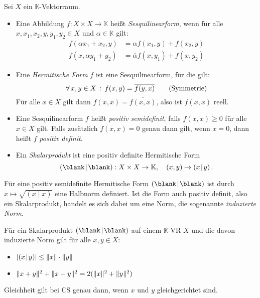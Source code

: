 \documentclass{cheat-sheet}
\newcommand{\K}{\mathbb{K}}
\newcommand{\scp}[2]{\left( #1 \!\mid\! #2 \right)} %
\begin{document}
\begin{defn}
  Sei $X$ ein $\K$-Vektorraum.
  \begin{itemize}
    \item Eine Abbildung $f : X \times X \to \K$ heißt \emph{Sesquilinearform}, wenn für alle $x, x_1, x_2, y, y_1, y_2 \in X$ und $\alpha \in \K$ gilt:
    \begin{align*}
      f(\alpha x_1 + x_2, y) &= \alpha f(x_1, y) + f(x_2, y) \tag*{(Linearität im 1. Arg)} \\
      f(x, \alpha y_1 + y_2) &= \overline{\alpha} f(x, y_1) + f(x, y_2) \tag*{(Antilinearität im 2. Arg)}
    \end{align*}
    \item Eine \emph{Hermitische Form} $f$ ist eine Sesquilinearform, für die gilt:
    \[ \forall \, {x, y \in X} \,:\, f(x, y) = \overline{f(y, x)} \tag*{(Symmetrie)} \]
    Für alle $x \in X$ gilt dann $f(x, x) = \overline{f(x, x)}$, also ist $f(x, x)$ reell.
    \item Eine Sesquilinearform $f$ heißt \emph{positiv semidefinit}, falls $f(x, x) \geq 0$ für alle $x \in X$ gilt. Falls zusätzlich $f(x, x) = 0$ genau dann gilt, wenn $x = 0$, dann heißt $f$ \emph{positiv definit}.
    \item Ein \emph{Skalarprodukt} ist eine positiv definite Hermitische Form
    \[ \scp{\blank}{\blank} : X \times X \to \K, \quad (x, y) \mapsto \scp{x}{y}. \]
  \end{itemize}
\end{defn}

\begin{satz}
  Für eine positiv semidefinite Hermitische Form $\scp{\blank}{\blank}$ ist durch $x \mapsto \sqrt{\scp{x}{x}}$ eine Halbnorm definiert. Ist die Form auch positiv definit, also ein Skalarprodukt, handelt es sich dabei um eine Norm, die sogenannte \emph{induzierte Norm}.
\end{satz}

\begin{satz}
  Für ein Skalarprodukt $\scp{\blank}{\blank}$ auf einem $\K$-VR $X$ und die davon induzierte Norm gilt für alle $x, y \in X$:
  \begin{itemize}
    \item $\abs{\scp{x}{y}} \leq \norm{x} \cdot \norm{y}$ 
    \item $\lVert x+y\rVert^2 + \lVert x-y\rVert^2 = 2 (\lVert x\rVert^2 + \lVert y\rVert^2)$ 
  \end{itemize}
  Gleichheit gilt bei CS genau dann, wenn $x$ und $y$ gleichgerichtet sind.
\end{satz}
\end{document}
